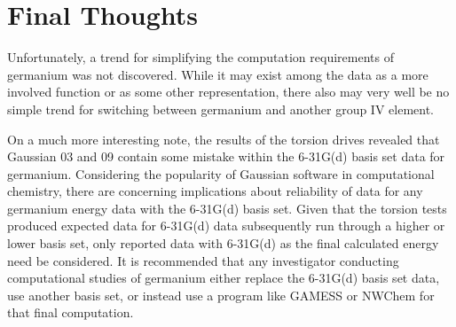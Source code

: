 \section{Final Thoughts}

Unfortunately, a trend for simplifying the computation requirements of germanium was not discovered.
While it may exist among the data as a more involved function or as some other representation, there also may very well be no simple trend for switching between germanium and another group IV element.

On a much more interesting note, the results of the torsion drives revealed that Gaussian 03 and 09 contain some mistake within the 6-31G(d) basis set data for germanium. 
Considering the popularity of Gaussian software in computational chemistry, there are concerning implications about reliability of data for any germanium energy data with the 6-31G(d) basis set. 
Given that the torsion tests produced expected data for 6-31G(d) data subsequently run through a higher or lower basis set, only reported data with 6-31G(d) as the final calculated energy need be considered.
It is recommended that any investigator conducting computational studies of germanium either replace the 6-31G(d) basis set data, use another basis set, or instead use a program like GAMESS or NWChem for that final computation.



